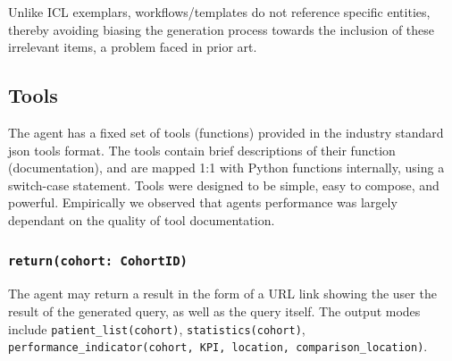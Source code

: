 \documentclass[11pt]{article}
\begin{document}
Unlike ICL exemplars, workflows/templates do not reference specific entities, thereby avoiding biasing the generation process towards the inclusion of these irrelevant items, a problem faced in prior art.

\subsection{Tools}
The agent has a fixed set of tools (functions) provided in the industry standard json tools format.
The tools contain brief descriptions of their function (documentation), and are mapped 1:1 with Python functions internally, using a switch-case statement.
Tools were designed to be simple, easy to compose, and powerful. Empirically we observed that agents performance was largely dependant on the quality of tool documentation.

\subsubsection*{\texttt{return(cohort: CohortID)}}
The agent may return a result in the form of a URL link showing the user the result of the generated query, as well as the query itself.
The output modes include \texttt{patient\_list(cohort)}, \texttt{statistics(cohort)}, \texttt{performance\_indicator(cohort, KPI, location, comparison\_location)}.
\end{document}
